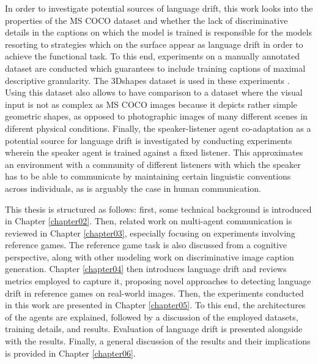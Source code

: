 In order to investigate potential sources of language drift, this work looks into the properties of the MS COCO dataset and whether the lack of discriminative details in the captions on which the model is trained is responsible for the models resorting to strategies which on the surface appear as language drift in order to achieve the functional task. To this end, experiments on a manually annotated dataset are conducted which guarantees to include training captions of maximal descriptive granularity. The 3Dshapes dataset is used in these experiments \parencite{burgess20183d}. Using this dataset also allows to have comparison to a dataset where the visual input is not as complex as MS COCO images because it depicts rather simple geometric shapes, as opposed to photographic images of many different scenes in diferent physical conditions. Finally, the speaker-listener agent co-adaptation as a potential source for language drift is investigated by conducting experiments wherein the speaker agent is trained against a fixed listener. This approximates an environment with a community of different listeners with which the speaker has to be able to communicate by maintaining certain linguistic conventions across individuals, as is arguably the case in human communication. 


This thesis is structured as follows: first, some technical background is introduced in Chapter \ref{chapter02}. Then, related work on multi-agent communication is reviewed in Chapter \ref{chapter03}, especially focusing on experiments involving reference games. The reference game task is also discussed from a cognitive perspective, along with other modeling work on discriminative image caption generation. Chapter \ref{chapter04} then introduces language drift and reviews metrics employed to capture it, proposing novel approaches to detecting language drift in reference games on real-world images. Then, the experiments conducted in this work are presented in Chapter \ref{chapter05}. To this end, the architectures of the agents are explained, followed by a discussion of the employed datasets, training details, and results. Evaluation of language drift is presented alongside with the results. Finally, a general discussion of the results and their implications is provided in Chapter \ref{chapter06}. %

